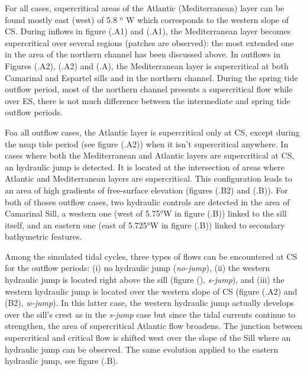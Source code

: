 For all cases, supercritical areas of the Atlantic (Mediterranean) layer can be found mostly east (west) of 5.8 $^\text{o}$ W which corresponds to the western slope of CS. During inflows in figure (.A1) and (.A1), the Mediterranean layer becomes supercritical over several regions (patches are observed): the most extended one in the area of the northern channel has been discussed above. In outflows in Figures (.A2), (.A2) and (.A), the Mediterranean layer is supercritical at both Camarinal and Espartel sills and in the northern channel.  During the spring tide outflow period, most of the northern channel presents a supercritical flow while over ES, there is not much difference between the intermediate and spring tide outflow periods.

Foa all outflow cases, the Atlantic layer is supercritical only at CS, except during the neap tide period (see figure (.A2)) when it isn't supercritical anywhere. In cases where both the Mediterranean and Atlantic layers are supercritical at CS, an hydraulic jump is detected. It is located at the intersection of areas where Atlantic and Mediterranean layers are supercritical. This configuration leads to an area of high gradients of free-surface elevation (figures (.B2) and (.B)). For both of thoses outflow cases, two hydraulic controls are detected in the area of Camarinal Sill, a western one (west of 5.75°W in figure (.B)) linked to the sill itself, and an eastern one (east of 5.725°W in figure (.B)) linked to secondary bathymetric features.

Among the simulated tidal cycles, three types of flows can be encountered at CS for the outflow periods: (i) no hydraulic jump (\textit{no-jump}), (ii) the western hydraulic jump is located right above the sill (figure (), \textit{s-jump}), and (iii) the western hydraulic jump is located over the western slope of CS (figure (.A2) and (B2), \textit{w-jump}). In this latter case, the western hydraulic jump actually develops over the sill's crest as in the \textit{s-jump} case but since the tidal currents continue to strengthen, the area of supercritical Atlantic flow broadens. The junction between supercritical and critical flow is shifted west over the slope of the Sill where an hydraulic jump can be observed. The same evolution applied to the eastern hydraulic jump, see figure (.B). 

